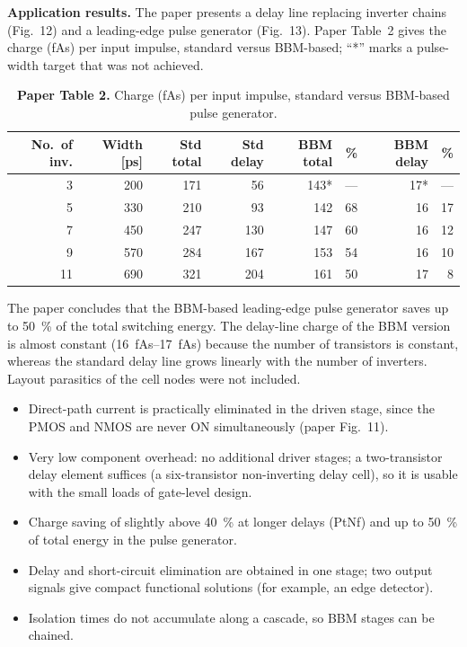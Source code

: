 \documentclass[11pt,a4paper]{article}
\begin{document}
\textbf{Application results.} The paper presents a delay line replacing inverter chains (Fig.~12) and a leading-edge pulse generator (Fig.~13). Paper Table~2 gives the charge (fAs) per input impulse, standard versus BBM-based; ``*'' marks a pulse-width target that was not achieved.

\begin{table}[H]
  \centering\small
  \caption*{\textbf{Paper Table 2.} Charge (fAs) per input impulse, standard versus BBM-based pulse generator.}
  \begin{tabular}{@{}r r r r r r r r@{}}
    \toprule
    No.\ of inv. & Width [ps] & Std total & Std delay & BBM total & \% & BBM delay & \%\\
    \midrule
    3  & 200 & 171 & 56  & 143* & --- & 17* & ---\\
    5  & 330 & 210 & 93  & 142  & 68  & 16  & 17\\
    7  & 450 & 247 & 130 & 147  & 60  & 16  & 12\\
    9  & 570 & 284 & 167 & 153  & 54  & 16  & 10\\
    11 & 690 & 321 & 204 & 161  & 50  & 17  & 8\\
    \bottomrule
  \end{tabular}
\end{table}

The paper concludes that the BBM-based leading-edge pulse generator saves up to \SI{50}{\percent} of the total switching energy. The delay-line charge of the BBM version is almost constant (\SIrange{16}{17}{fAs}) because the number of transistors is constant, whereas the standard delay line grows linearly with the number of inverters. Layout parasitics of the cell nodes were not included.

\begin{itemize}
  \item Direct-path current is practically eliminated in the driven stage, since the PMOS and NMOS are never ON simultaneously (paper Fig.~11).
  \item Very low component overhead: no additional driver stages; a two-transistor delay element suffices (a six-transistor non-inverting delay cell), so it is usable with the small loads of gate-level design.
  \item Charge saving of slightly above \SI{40}{\percent} at longer delays (PtNf) and up to \SI{50}{\percent} of total energy in the pulse generator.
  \item Delay and short-circuit elimination are obtained in one stage; two output signals give compact functional solutions (for example, an edge detector).
  \item Isolation times do not accumulate along a cascade, so BBM stages can be chained.
\end{itemize}
\end{document}
